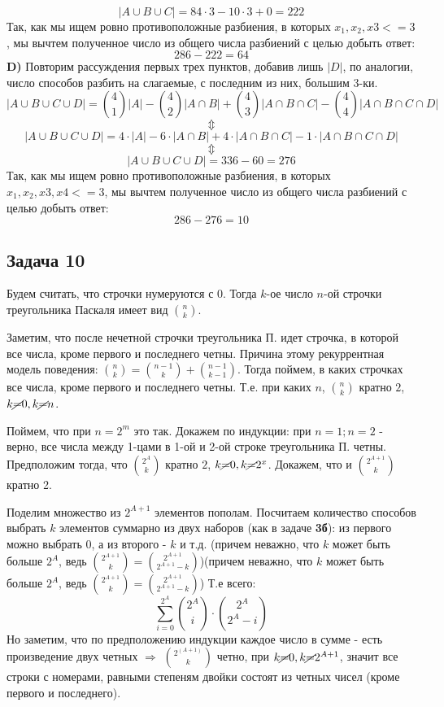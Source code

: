 \documentclass{article}
\begin{document}
 $$  |A \cup B \cup C| = 84 \cdot 3 - 10 \cdot 3 + 0 = 222$$
 Так, как мы ищем ровно противоположные разбиения, в которых $ x_1, x_2, x3 <= 3$, мы вычтем полученное число из общего числа разбиений с целью добыть ответ:
 $$ 286 - 222 = 64 $$
 \textbf{D)} Повторим рассуждения первых трех пунктов, добавив лишь $ |D| $, по аналогии, число способов разбить на слагаемые, с последним из них, большим 3-ки. 
  $$ |A \cup B \cup C \cup D| = {4 \choose 1} |A| - {4 \choose 2} |A \cap B| + {4 \choose 3} |A \cap B \cap C| - {4 \choose 4} |A \cap B \cap C \cap D|$$
  $$\Updownarrow$$
  $$ |A \cup B \cup C \cup D| = 4 \cdot |A| - 6 \cdot |A \cap B| + 4 \cdot |A \cap B \cap C| - 1 \cdot |A \cap B \cap C \cap D|$$
  $$\Updownarrow$$
  $$ |A \cup B \cup C \cup D| = 336 - 60 = 276 $$
  Так, как мы ищем ровно противоположные разбиения, в которых $ x_1, x_2, x3, x4 <= 3$, мы вычтем полученное число из общего числа разбиений с целью добыть ответ:
  $$ 286 - 276 = 10 $$
 
 
 
 \begin{center}
 	\subsection*{Задача 10}
 \end{center}
	 Будем считать, что строчки нумеруются с $0$.
 Тогда $k$-ое число $n$-ой строчки треугольника Паскаля имеет вид ${n \choose k}$.
 
 Заметим, что после нечетной строчки треугольника П. идет строчка, в которой все числа, кроме первого и последнего четны. Причина этому рекуррентная модель поведения: ${n \choose k} = {n - 1 \choose k} + {n - 1 \choose k - 1}$.
 Тогда поймем, в каких строчках все числа, кроме первого и последнего четны. Т.е. при каких $n$, ${n \choose k}$ кратно $2$, $k \cancel{=} 0, k \cancel{=}n$.
 
 
 Поймем, что при $n = 2^m$ это так. Докажем по индукции: при $n = 1; n = 2$ - верно, все числа между 1-цами в 1-ой и 2-ой строке треугольника П. четны. 
 Предположим тогда, что ${2^A \choose k}$ кратно $2$, $k \cancel{=} 0, k \cancel{=}2^x$. Докажем, что и ${2^{A + 1} \choose k}$ кратно 2.
 
 Поделим множество из $2^{A + 1}$ элементов пополам. Посчитаем количество способов выбрать $k$ элементов суммарно из двух наборов (как в задаче \textbf{3б}): из первого можно выбрать 0, а из второго - $k$ и т.д. (причем неважно, что $k$ может быть больше $2^A$, ведь ${2^{A + 1} \choose k} = {2^{A + 1} \choose 2^{A + 1} - k}$)(причем неважно, что $k$ может быть больше $2^A$, ведь ${2^{A + 1} \choose k} = {2^{A + 1} \choose 2^{A + 1} - k}$) Т.е всего:
 $$ \sum_{i=0}^{2 ^ A} {2^A \choose i} \cdot {2^A \choose 2^A - i}$$
 Но заметим, что по предположению индукции каждое число в сумме - есть произведение двух четных $\Rightarrow$ ${2^(A+1) \choose k}$ четно, при $k \cancel{=} 0, k\cancel{=}2^{A+1}$, значит все строки с номерами, равными степеням двойки состоят из четных чисел (кроме первого и последнего).
 
\end{document}
